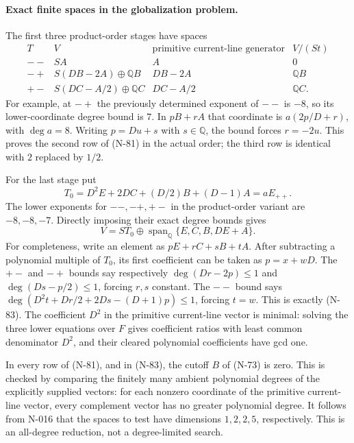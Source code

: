 \paragraph{Exact finite spaces in the globalization problem.}
The first three product-order stages have spaces
\[
 \begin{array}{c|c|c|c}
 T&V&\text{primitive current-line generator}&V/(S t)\\\hline
 --&SA&A&0\\
 -+&S(DB-2A)\oplus\mathbb Q B&DB-2A&\mathbb Q B\\
 +-&S(DC-A/2)\oplus\mathbb Q C&DC-A/2&\mathbb Q C.
 \end{array}
 \tag{N-81}
\]
For example, at $-+$ the previously determined exponent of $--$ is
$-8$, so its lower-coordinate degree bound is $7$.  In $pB+rA$ that
coordinate is $a(2p/D+r)$, with $\deg a=8$.  Writing $p=Du+s$ with
$s\in\mathbb Q$, the bound forces $r=-2u$.  This proves the second
row of (N-81) in the actual order; the third row is identical with
$2$ replaced by $1/2$.

For the last stage put
\[
 T_0=D^2E+2DC+(D/2)B+(D-1)A=aE_{++}.
 \tag{N-82}
\]
The lower exponents for $--,-+,+-$ in the product-order variant
are $-8,-8,-7$.  Directly imposing their exact degree bounds gives
\[
 V=S T_0\oplus
        \operatorname{span}_{\mathbb Q}\{E,C,B,DE+A\}.
 \tag{N-83}
\]
For completeness, write an element as $pE+rC+sB+tA$.  After subtracting
a polynomial multiple of $T_0$, its first coefficient can be taken
as $p=x+wD$.  The $+-$ and $-+$ bounds say respectively
$\deg(Dr-2p)\le1$ and $\deg(Ds-p/2)\le1$, forcing $r,s$ constant.
The $--$ bound says
$\deg(D^2t+Dr/2+2Ds-(D+1)p)\le1$, forcing $t=w$.
This is exactly (N-83).  The coefficient $D^2$ in the primitive
current-line vector is minimal: solving the three lower equations
over $F$ gives coefficient ratios with least common denominator
$D^2$, and their cleared polynomial coefficients have gcd one.

In every row of (N-81), and in (N-83), the cutoff $B$ of (N-73) is
zero.  This is checked by comparing the finitely many ambient
polynomial degrees of the explicitly supplied vectors: for each
nonzero coordinate of the primitive current-line vector, every
complement vector has no greater polynomial degree.  It follows
from N-016 that the spaces to test have dimensions $1,2,2,5$,
respectively.  This is an all-degree reduction, not a degree-limited
search.

